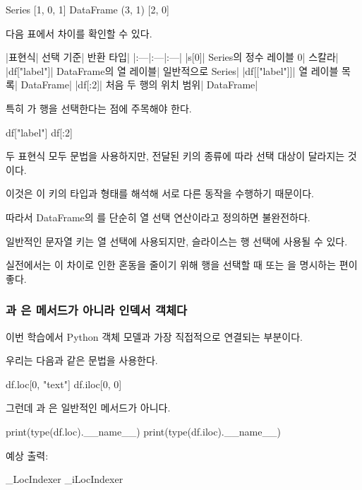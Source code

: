 \begin{dhkzsh}
Series
[1, 0, 1]
DataFrame
(3, 1)
[2, 0]
\end{dhkzsh}

다음 표에서 차이를 확인할 수 있다.

\begin{dhktable}
|표현식|	선택 기준|	반환 타입|
|:---|:---|:---|
|s[0]|	Series의 정수 레이블 0|	스칼라|
|df["label"]|	DataFrame의 열 레이블|	일반적으로 Series|
|df[["label"]]|	열 레이블 목록|	DataFrame|
|df[:2]|	처음 두 행의 위치 범위|	DataFrame|
\end{dhktable}

특히 가 행을 선택한다는 점에 주목해야 한다.

\begin{dhkcode}
df["label"]
df[:2]
\end{dhkcode}

두 표현식 모두  문법을 사용하지만, 전달된 키의 종류에 따라 선택 대상이 달라지는 것이다.

이것은 이 키의 타입과 형태를 해석해 서로 다른 동작을 수행하기 때문이다.

따라서 DataFrame의 \zsh{[]}를 단순히 열 선택 연산이라고 정의하면 불완전하다.

일반적인 문자열 키는 열 선택에 사용되지만, 슬라이스는 행 선택에 사용될 수 있다.

실전에서는 이 차이로 인한 혼동을 줄이기 위해 행을 선택할 때  또는 을 명시하는 편이 좋다.

\subsubsection{과 은 메서드가 아니라 인덱서 객체다}

이번 학습에서 Python 객체 모델과 가장 직접적으로 연결되는 부분이다.

우리는 다음과 같은 문법을 사용한다.

\begin{dhkcode}
df.loc[0, "text"]
df.iloc[0, 0]
\end{dhkcode}

그런데 과 은 일반적인 메서드가 아니다.

\begin{dhkcode}
print(type(df.loc).__name__)
print(type(df.iloc).__name__)
\end{dhkcode}

예상 출력:

\begin{dhkzsh}
_LocIndexer
_iLocIndexer
\end{dhkzsh}

